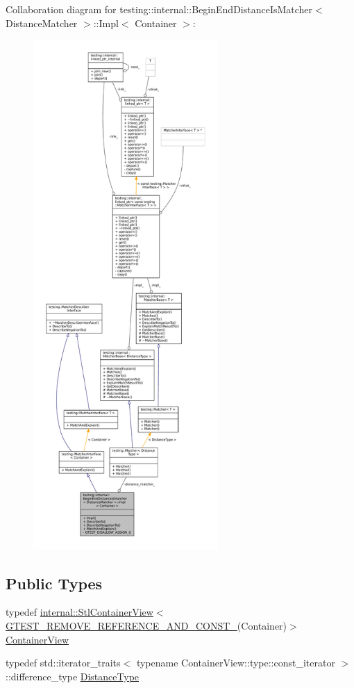 Collaboration diagram for testing\+:\+:internal\+:\+:Begin\+End\+Distance\+Is\+Matcher$<$ Distance\+Matcher $>$\+:\+:Impl$<$ Container $>$\+:
\nopagebreak
\begin{figure}[H]
\begin{center}
\leavevmode
\includegraphics[height=550pt]{classtesting_1_1internal_1_1BeginEndDistanceIsMatcher_1_1Impl__coll__graph}
\end{center}
\end{figure}
\subsection*{Public Types}
\begin{DoxyCompactItemize}
\item 
typedef \hyperlink{classtesting_1_1internal_1_1StlContainerView}{internal\+::\+Stl\+Container\+View}$<$ \hyperlink{gtest-internal_8h_a874567b176266188fabfffb8393267ce}{G\+T\+E\+S\+T\+\_\+\+R\+E\+M\+O\+V\+E\+\_\+\+R\+E\+F\+E\+R\+E\+N\+C\+E\+\_\+\+A\+N\+D\+\_\+\+C\+O\+N\+S\+T\+\_\+}(Container)$>$ \hyperlink{classtesting_1_1internal_1_1BeginEndDistanceIsMatcher_1_1Impl_a5c76ede38c6143430f56e02e9024f535}{Container\+View}
\item 
typedef std\+::iterator\+\_\+traits$<$ typename Container\+View\+::type\+::const\+\_\+iterator $>$\+::difference\+\_\+type \hyperlink{classtesting_1_1internal_1_1BeginEndDistanceIsMatcher_1_1Impl_a10d901c49e2793dae6bcce6fa1a4e9fe}{Distance\+Type}
\end{DoxyCompactItemize}
